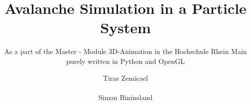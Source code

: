 \documentclass{sig-alternate-05-2015}
\begin{document}
\title{Avalanche Simulation in a Particle System}
\subtitle{As a part of the Master - Module 3D-Animation in the Hochschule Rhein Main
purely written in Python and OpenGL}
%
%
%
%
%

\author{
%
%
\alignauthor
Tiras Zemicael\\
       \\
\alignauthor
Simon Rininsland\\
       \\
}
\end{document}
